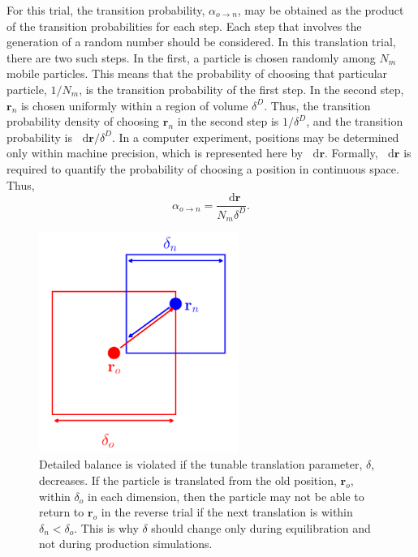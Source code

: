 \documentclass[
  9pt,
  bestpractices,
]{livecoms}
\newcommand*\diff{\mathop{}\!\mathrm{d}}
\begin{document}
For this trial, the transition probability, $\alpha_{o\rightarrow n}$, may be obtained as the product of the transition probabilities for each step.
Each step that involves the generation of a random number should be considered.
In this translation trial, there are two such steps.
In the first, a particle is chosen randomly among $N_m$ mobile particles.
This means that the probability of choosing that particular particle, $1/N_m$, is the transition probability of the first step.
In the second step, $\mathbf{r}_n$ is chosen uniformly within a region of volume $\delta^D$.
Thus, the transition probability density of choosing $\mathbf{r}_n$ in the second step is $1/\delta^D$, and the transition probability is $\diff\mathbf{r}/\delta^D$.
In a computer experiment, positions may be determined only within machine precision, which is represented here by $\diff\mathbf{r}$.
Formally, $\diff\mathbf{r}$ is required to quantify the probability of choosing a position in continuous space.
Thus,
\begin{equation}
\alpha_{o\rightarrow n} = \frac{\diff\mathbf{r}}{N_m \delta^D}.
\label{eq:lhs_disp_forward}
\end{equation}

\begin{figure}
\begin{centering}
\includegraphics[width=6.5cm]{../figures/lhs_nvt.pdf}
\caption{
Detailed balance is violated if the tunable translation parameter, $\delta$, decreases.
If the particle is translated from the old position, $\mathbf{r}_o$, within $\delta_o$ in each dimension, then the particle may not be able to return to $\mathbf{r}_o$ in the reverse trial if the next translation is within $\delta_n<\delta_o$.
This is why $\delta$ should change only during equilibration and not during production simulations.
}
\label{fig:lhs_nvt}
\end{centering}
\end{figure}
\end{document}
